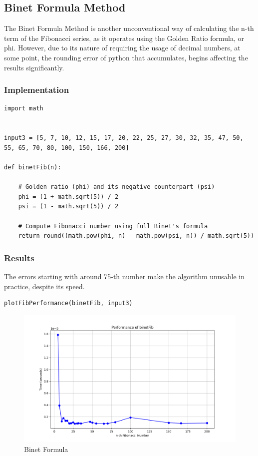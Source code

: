 \documentclass[a4paper, 12pt]{article}
\begin{document}
\subsection{Binet Formula Method}
\label{sec:orga791916}
The Binet Formula Method is another unconventional way of calculating the n-th term of the
Fibonacci series, as it operates using the Golden Ratio formula, or phi. However, due to its nature of
requiring the usage of decimal numbers, at some point, the rounding error of python that accumulates,
begins affecting the results significantly.
\subsubsection{Implementation}
\label{sec:org99be789}
\begin{verbatim}
import math


input3 = [5, 7, 10, 12, 15, 17, 20, 22, 25, 27, 30, 32, 35, 47, 50, 55, 65, 70, 80, 100, 150, 166, 200]

def binetFib(n):

    # Golden ratio (phi) and its negative counterpart (psi)
    phi = (1 + math.sqrt(5)) / 2
    psi = (1 - math.sqrt(5)) / 2

    # Compute Fibonacci number using full Binet's formula
    return round((math.pow(phi, n) - math.pow(psi, n)) / math.sqrt(5))
\end{verbatim}
\subsubsection{Results}
\label{sec:org9feab26}
The errors starting with around 75-th number make the algorithm unusable in practice, despite its speed.
\begin{verbatim}
plotFibPerformance(binetFib, input3)
\end{verbatim}
\begin{figure}[htbp]  %
  \centering  %
  \includegraphics[width=\textwidth]{./binetFormulaFib.png}  %
  \caption{Binet Formula}  %
\end{figure}
\end{document}
